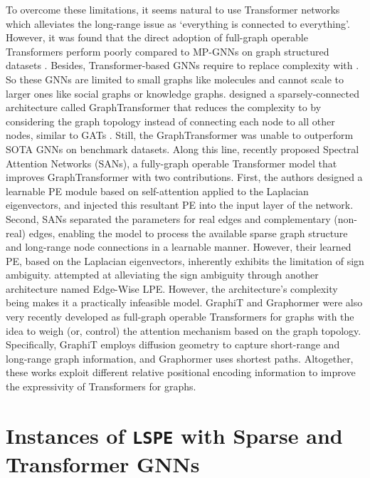 \documentclass{article} \usepackage{iclr2021_conference,times}
\begin{document}
To overcome these limitations, it seems natural to use Transformer networks \citep{vaswani2017attention} which alleviates the long-range issue as `everything is connected to everything'. However, it was found that the direct adoption of full-graph operable Transformers perform poorly compared to MP-GNNs on graph structured datasets \citep{dwivedi2021generalization}. Besides, Transformer-based GNNs require to replace  complexity with . So these GNNs are limited to small graphs like molecules and cannot scale to larger ones like social graphs or knowledge graphs. \cite{dwivedi2021generalization} designed a sparsely-connected architecture called GraphTransformer that reduces the complexity to  by considering the graph topology instead of connecting each node to all other nodes, similar to GATs \citep{velivckovic2018graph}. Still, the GraphTransformer was unable to outperform SOTA GNNs on benchmark datasets. 
Along this line, \cite{kreuzer2021rethinking} recently proposed Spectral Attention Networks (SANs), a fully-graph operable Transformer model that improves GraphTransformer \citep{dwivedi2021generalization} with two contributions. First, the authors designed a learnable PE module based on self-attention 
applied to the Laplacian eigenvectors, and injected this resultant PE into the input layer of the network. Second, SANs separated the parameters for real edges and complementary (non-real) edges, enabling the model to process the available sparse graph structure and long-range node connections in a learnable manner. However, their learned PE, based on the Laplacian eigenvectors, inherently exhibits the limitation of sign ambiguity. \cite{kreuzer2021rethinking} attempted at alleviating the sign ambiguity through another architecture named Edge-Wise LPE. However, the architecture's complexity being  makes it a practically infeasible model.
GraphiT \citep{mialon2021graphit} and Graphormer \citep{ying2021transformers} were also very recently developed as full-graph operable Transformers for graphs with the idea to weigh (or, control) the attention mechanism based on the graph topology. Specifically, GraphiT employs diffusion geometry to capture short-range and long-range graph information, and Graphormer uses shortest paths. Altogether, these works exploit different relative positional encoding information to improve the expressivity of Transformers for graphs.
 

\section{Instances of \texttt{LSPE} with Sparse and Transformer GNNs}
\label{sec:model_eqns_supplementary}
\end{document}
